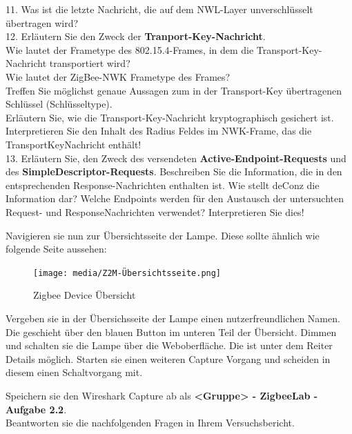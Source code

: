 \begin{Fragen}
11. Was ist die letzte Nachricht, die auf dem NWL-Layer unverschlüsselt übertragen wird?\\

12. Erläutern Sie den Zweck der \textbf{Tranport-Key-Nachricht}.\\
 Wie lautet der Frametype des 802.15.4-Frames, in dem die Transport-Key-Nachricht transportiert wird? \\
 Wie lautet der ZigBee-NWK Frametype des Frames?\\
 Treffen Sie möglichst genaue Aussagen zum in der Transport-Key übertragenen Schlüssel (Schlüsseltype). \\
 Erläutern Sie, wie die Transport-Key-Nachricht kryptographisch gesichert ist.\\
 Interpretieren Sie den Inhalt des Radius Feldes im NWK-Frame, das die TransportKeyNachricht enthält!\\

13. Erläutern Sie, den Zweck des versendeten \textbf{Active-Endpoint-Requests} und des \textbf{SimpleDescriptor-Requests}.
 Beschreiben Sie die Information, die in den entsprechenden Response-Nachrichten enthalten ist. 
 Wie stellt deConz die Information dar?
 Welche Endpoints werden für den Austausch der untersuchten Request- und ResponseNachrichten verwendet? Interpretieren Sie dies!
\end{Fragen}

Navigieren sie nun zur Übersichtsseite der Lampe. Diese sollte ähnlich wie folgende Seite aussehen:

\begin{figure}[H]
    \centering
    \texttt{[image: media/Z2M-Übersichtsseite.png]}
    \caption{Zigbee Device Übersicht}
\end{figure}

Vergeben sie in der Übersichsseite der Lampe einen nutzerfreundlichen Namen. Die geschieht über den blauen Button im unteren Teil der Übersicht.
Dimmen und schalten sie die Lampe über die Weboberfläche. Die ist unter dem Reiter \grqq Details\grqq{} möglich. Starten sie einen weiteren Capture Vorgang und
scheiden in diesem einen Schaltvorgang mit.

\begin{Aufgabe}
    Speichern sie den Wireshark Capture ab als \textbf{\grqq <Gruppe> - ZigbeeLab - Aufgabe 2.2\grqq{}}. \\
    Beantworten sie die nachfolgenden Fragen in Ihrem Versuchsbericht.
\end{Aufgabe}

